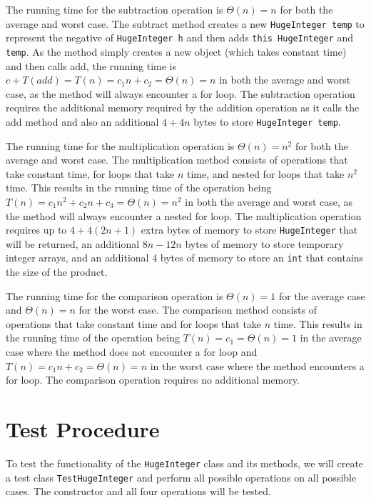 \documentclass[12pt]{article}
\newcommand{\code}[1]{\texttt{#1}}
\begin{document}
The running time for the subtraction operation is $\Theta(n)=n$ for both the average and worst case. The subtract method creates a new \code{HugeInteger temp} to represent the negative of \code{HugeInteger h} and then adds \code{this HugeInteger} and \code{temp}. As the method simply creates a new object (which takes constant time) and then calls add, the running time is $c + T(add) = T(n) = c_1n + c_2 = \Theta(n)=n$ in both the average and worst case, as the method will always encounter a for loop. The subtraction operation requires the additional memory required by the addition operation as it calls the add method and also an additional $4+4n$ bytes to store \code{HugeInteger temp}.

The running time for the multiplication operation is $\Theta(n)=n^2$ for both the average and worst case. The multiplication method consists of operations that take constant time, for loops that take $n$ time, and nested for loops that take $n^2$ time. This results in the running time of the operation being $T(n) = c_1n^2 + c_2n + c_3= \Theta(n)=n^2$ in both the average and worst case, as the method will always encounter a nested for loop. The multiplication operation requires up to $4+4(2n+1)$ extra bytes of memory to store \code{HugeInteger} that will be returned, an additional $8n-12n$ bytes of memory to store temporary integer arrays, and an additional $4$ bytes of memory to store an \code{int} that contains the size of the product.

The running time for the comparison operation is $\Theta(n)=1$ for the average case and $\Theta(n)=n$ for the worst case. The comparison method consists of operations that take constant time and for loops that take $n$ time. This results in the running time of the operation being $T(n) = c_1 = \Theta(n)=1$ in the average case where the method does not encounter a for loop and $T(n) = c_1n + c_2 = \Theta(n)=n$ in the worst case where the method encounters a for loop. The comparison operation requires no additional memory.

\section*{Test Procedure}
To test the functionality of the \code{HugeInteger} class and its methods, we will create a test class \code{TestHugeInteger} and perform all possible operations on all possible cases. The constructor and all four operations will be tested.
\end{document}
